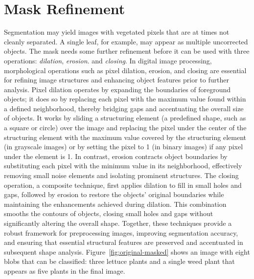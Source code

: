 \documentclass[letterpaper]{report}
\begin{document}
{\section{Mask Refinement}
\label{section:mask-refinement}
Segmentation may yield images with vegetated pixels that are at times not cleanly separated. A single leaf, for example, may appear as multiple uncorrected objects. The mask needs some further refinement before it can be used with three operations: \textit{dilation}, \textit{erosion}. and \textit{closing}. In digital image processing, morphological operations such as pixel dilation, erosion, and closing are essential for refining image structures and enhancing object features prior to further analysis. Pixel dilation operates by expanding the boundaries of foreground objects; it does so by replacing each pixel with the maximum value found within a defined neighborhood, thereby bridging gaps and accentuating the overall size of objects. It works by sliding a structuring element (a predefined shape, such as a square or circle) over the image and replacing the pixel under the center of the structuring element with the maximum value covered by the structuring element (in grayscale images) or by setting the pixel to 1 (in binary images) if any pixel under the element is 1. In contrast, erosion contracts object boundaries by substituting each pixel with the minimum value in its neighborhood, effectively removing small noise elements and isolating prominent structures. The closing operation, a composite technique, first applies dilation to fill in small holes and gaps, followed by erosion to restore the objects' original boundaries while maintaining the enhancements achieved during dilation.  This combination smooths the contours of objects, closing small holes and gaps without significantly altering the overall shape. Together, these techniques provide a robust framework for preprocessing images, improving segmentation accuracy, and ensuring that essential structural features are preserved and accentuated in subsequent shape analysis.
Figure~\ref{fig:original-masked} shows an image with  eight blobs that can be classified: three lettuce plants and a single weed plant that appears as five plants in the final image.


}
\end{document}
